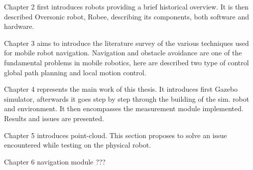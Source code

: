 Chapter 2 first introduces robots providing a brief historical overview. It is then described Oversonic robot, Robee, describing its components, both software and hardware.

Chapter 3 aims to introduce the literature survey of the various techniques used for
mobile robot navigation. Navigation and obstacle avoidance are one of the
fundamental problems in mobile robotics, here are described two type of control global
path planning and local motion control.

Chapter 4 represents the main work of this thesis. It introduces first Gazebo simulator, afterwards it goes step by step through the building of the sim. robot and environment. It then encompasses the measurement module implemented. Results and issues are presented.

Chapter 5 introduces point-cloud. This section proposes to solve an issue encountered while testing on the physical robot. 

Chapter 6 navigation module ???



